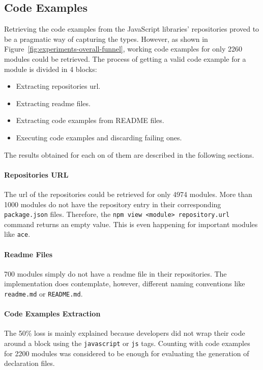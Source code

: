 \documentclass[a4paper,english,cleveref, autoref]{lipics-v2019}
\newcommand{\figref}[1]{Figure~\ref{#1}}
\begin{document}
\subsection{Code Examples}
Retrieving the code examples from the JavaScript libraries' repositories proved to be a pragmatic way of capturing the types. However, as shown in \figref{fig:experiments-overall-funnel}, working code examples for only 2260 modules could be retrieved. The process of getting a valid code example for a module is divided in 4 blocks:
\begin{itemize}
	\item Extracting repositories url.
	\item Extracting readme files.
	\item Extracting code examples from README files.
	\item Executing code examples and discarding failing ones.
\end{itemize}

The results obtained for each on of them are described in the following sections.

\paragraph*{Repositories URL}
The url of the repositories could be retrieved for only 4974 modules. More than 1000 modules do not have the repository entry in their corresponding \texttt{package.json} files. Therefore, the \texttt{npm view <module> repository.url} command returns an empty value. This is even happening for important modules like \texttt{ace}.

\paragraph*{Readme Files}
700 modules simply do not have a readme file in their repositories. The implementation does contemplate, however, different naming conventions like \texttt{readme.md} or \texttt{README.md}.

\paragraph*{Code Examples Extraction}
The 50\% loss is mainly explained because developers did not wrap their code around a block using the \texttt{javascript} or \texttt{js} tags. Counting with code examples for 2200 modules was considered to be enough for evaluating the generation of declaration files.
\end{document}
